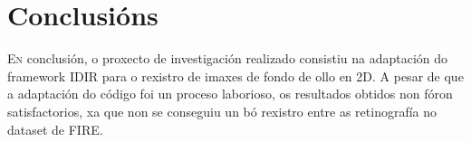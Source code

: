 \chapter{Conclusións}
\label{chap:Conclusións}

\lettrine{E}{n} conclusión, o proxecto de investigación realizado consistiu na adaptación do framework IDIR para o rexistro de imaxes de fondo de ollo en 2D.
A pesar de que a adaptación do código foi un proceso laborioso, os resultados obtidos non fóron satisfactorios, xa que non se conseguiu un bó rexistro entre as retinografía no dataset de FIRE.



